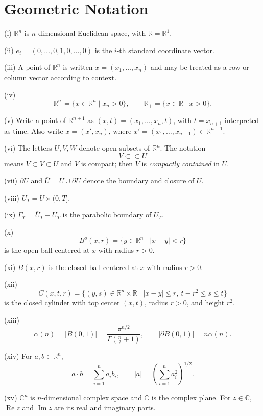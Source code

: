 \section{Geometric Notation}
\label{sec:geometric-notation}

\begin{definition}
\label{def:geometric-notation}
(i) $\mathbb R^n$ is $n$-dimensional Euclidean space, with $\mathbb R=\mathbb R^1$.

(ii) $e_i=(0,\ldots,0,1,0,\ldots,0)$ is the $i$-th standard coordinate vector.

(iii) A point of $\mathbb R^n$ is written $x=(x_1,\ldots,x_n)$ and may be treated as a row or column vector according to context.

(iv)
\[
\mathbb R_+^n=\{x\in\mathbb R^n\mid x_n>0\},
\qquad
\mathbb R_+=\{x\in\mathbb R\mid x>0\}.
\]

(v) Write a point of $\mathbb R^{n+1}$ as $(x,t)=(x_1,\ldots,x_n,t)$, with $t=x_{n+1}$ interpreted as time. Also write $x=(x',x_n)$, where $x'=(x_1,\ldots,x_{n-1})\in\mathbb R^{n-1}$.

(vi) The letters $U,V,W$ denote open subsets of $\mathbb R^n$. The notation
\[
V\subset\subset U
\]
means $V\subset\overline V\subset U$ and $\overline V$ is compact; then $V$ is \textit{compactly contained} in $U$.

(vii) $\partial U$ and $\overline U=U\cup\partial U$ denote the boundary and closure of $U$.

(viii) $U_T=U\times(0,T]$.

(ix) $\Gamma_T=\overline U_T-U_T$ is the parabolic boundary of $U_T$.

(x)
\[
B^o(x,r)=\{y\in\mathbb R^n\mid |x-y|<r\}
\]
is the open ball centered at $x$ with radius $r>0$.

(xi) $B(x,r)$ is the closed ball centered at $x$ with radius $r>0$.

(xii)
\[
C(x,t,r)=\{(y,s)\in\mathbb R^n\times\mathbb R
\mid |x-y|\leq r,\ t-r^2\leq s\leq t\}
\]
is the closed cylinder with top center $(x,t)$, radius $r>0$, and height $r^2$.

(xiii)
\[
\alpha(n)=|B(0,1)|=\frac{\pi^{n/2}}{\Gamma(\frac n2+1)},
\qquad
|\partial B(0,1)|=n\alpha(n).
\]

(xiv) For $a,b\in\mathbb R^n$,
\[
a\cdot b=\sum_{i=1}^n a_ib_i,
\qquad
|a|=\left(\sum_{i=1}^n a_i^2\right)^{1/2}.
\]

(xv) $\mathbb C^n$ is $n$-dimensional complex space and $\mathbb C$ is the complex plane. For $z\in\mathbb C$, $\operatorname{Re}z$ and $\operatorname{Im}z$ are its real and imaginary parts.
\end{definition}

